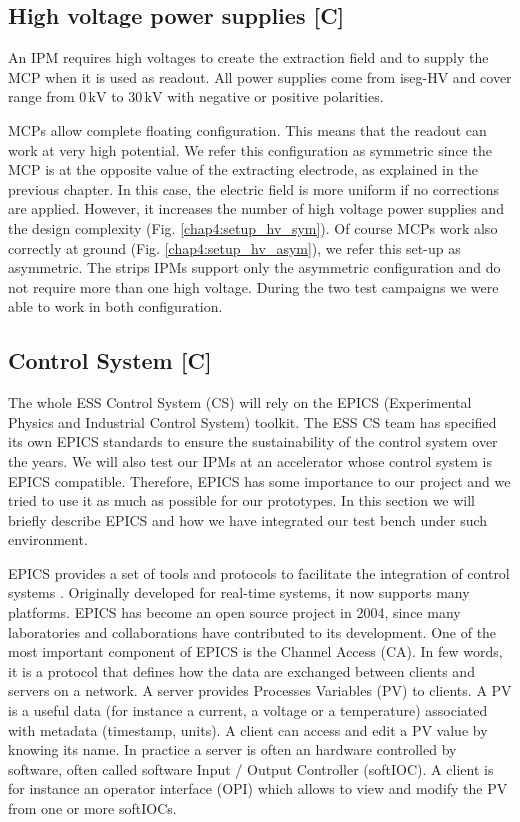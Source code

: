 \begin{refsection}
  \section{High voltage power supplies [C]}
  An IPM requires high voltages to create the extraction field and to supply the MCP when it is used as readout. All power supplies come from iseg-HV \cite{iseg2019} and cover range from $0\,\mathrm{kV}$ to $30\,\mathrm{kV}$ with negative or positive polarities.

  MCPs allow complete floating configuration. This means that the readout can work at very high potential. We refer this configuration as symmetric since the MCP is at the opposite value of the extracting electrode, as explained in the previous chapter. In this case, the electric field is more uniform if no corrections are applied. However, it increases the number of high voltage power supplies and the design complexity (Fig. \ref{chap4:setup_hv_sym}).
  Of course MCPs work also correctly at ground (Fig. \ref{chap4:setup_hv_asym}), we refer this set-up as asymmetric. The strips IPMs support only the asymmetric configuration and do not require more than one high voltage. During the two test campaigns we were able to work in both configuration.

  

  \subsection{Control System [C]}
  The whole ESS Control System (CS) will rely on the EPICS (Experimental Physics and Industrial Control System) toolkit. The ESS CS team has specified its own EPICS standards to ensure the sustainability of the control system over the years. We will also test our IPMs at an accelerator whose control system is EPICS compatible. Therefore, EPICS has some importance to our project and we tried to use it as much as possible for our prototypes. In this section we will briefly describe EPICS and how we have integrated our test bench under such environment.

  EPICS provides a set of tools and protocols to facilitate the integration of control systems \cite{epics2019}. Originally developed for real-time systems, it now supports many platforms. EPICS has become an open source project in 2004, since many laboratories and collaborations have contributed to its development.
  One of the most important component of EPICS is the Channel Access (CA). In few words, it is a protocol that defines how the data are exchanged between clients and servers on a network. A server provides Processes Variables (PV) to clients. A PV is a useful data (for instance a current, a voltage or a temperature) associated with metadata (timestamp, units). A client can access and edit a PV value by knowing its name. In practice a server is often an hardware controlled by software, often called software Input / Output Controller (softIOC). A client is for instance an operator interface (OPI) which allows to view and modify the PV from one or more softIOCs.


\end{refsection}
